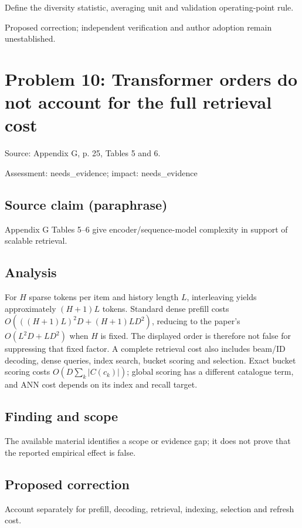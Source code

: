 \documentclass[11pt]{article}
\begin{document}
Define the diversity statistic, averaging unit and validation operating-point rule.

Proposed correction; independent verification and author adoption remain unestablished.

\section*{Problem 10: Transformer orders do not account for the full retrieval cost}

Source: Appendix G, p. 25, Tables 5 and 6.

Assessment: needs\_evidence; impact: needs\_evidence

\subsection*{Source claim (paraphrase)}

Appendix G Tables 5--6 give encoder/sequence-model complexity in support of scalable retrieval.

\subsection*{Analysis}

For \(H\) sparse tokens per item and history length \(L\), interleaving yields approximately \((H+1)L\) tokens. Standard dense prefill costs \(O(((H+1)L)^2D+(H+1)LD^2)\), reducing to the paper's \(O(L^2D+LD^2)\) when \(H\) is fixed. The displayed order is therefore not false for suppressing that fixed factor. A complete retrieval cost also includes beam/ID decoding, dense queries, index search, bucket scoring and selection. Exact bucket scoring costs \(O(D\sum_k|C(c_k)|)\); global scoring has a different catalogue term, and ANN cost depends on its index and recall target.

\subsection*{Finding and scope}

The available material identifies a scope or evidence gap; it does not prove that the reported empirical effect is false.

\subsection*{Proposed correction}

Account separately for prefill, decoding, retrieval, indexing, selection and refresh cost.
\end{document}
